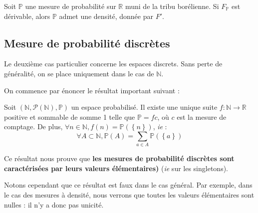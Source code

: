 \documentclass[../integ-proba.tex]{subfiles}
\begin{document}
    \begin{prop}
        Soit $\mathbb{P}$ une mesure de probabilité sur $\mathbb{R}$ muni de la tribu borélienne.
        Si $F_\mathbb{P}$ est dérivable, alors $\mathbb{P}$ admet une densité, donnée par $F'$.
    \end{prop}



        \subsection{Mesure de probabilité discrètes}
            Le deuxième cas particulier concerne les espaces discrets.
            Sans perte de généralité, on se place uniquement dans le cas de $\mathbb{N}$.

            On commence par énoncer le résultat important suivant :

            \begin{thm}
                Soit $\left(\mathbb{N}, \mathcal{P}(\mathbb{N}), \mathbb{P} \right)$ un espace probabilisé.
                Il existe une unique suite $f:\mathbb{N} \rightarrow \mathbb{R}$ positive et sommable de somme 1 telle que $\mathbb{P} = f c$, où $c$ est la mesure de comptage.
                De plus, $\forall n \in \mathbb{N}, f(n)=\mathbb{P}(\left\{n\right\})$, \textit{ie} :
                \begin{displaymath}
                    \forall A \subset \mathbb{N}, \mathbb{P}(A) = \sum_{a \in A} \mathbb{P}(\left\{ a \right\})
                \end{displaymath}
            \end{thm}

            \begin{rem}
                Ce résultat nous prouve que \textbf{les mesures de probabilité discrètes sont caractérisées par leurs valeurs élémentaires)} (\textit{ie} sur les singletons).

                Notons cependant que ce résultat est faux dans le cas général.
                Par exemple, dans le cas des mesures à densité, nous verrons que toutes les valeurs élémentaires sont nulles : il n'y a donc pas unicité.
            \end{rem}

\end{document}
